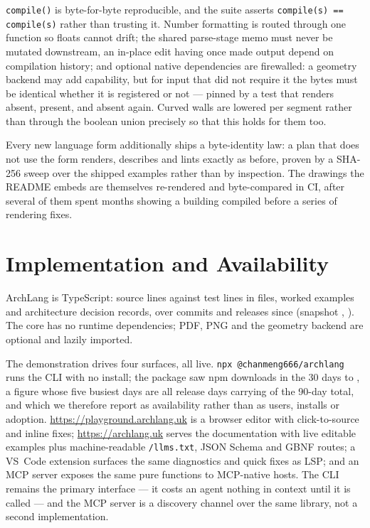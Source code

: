 \documentclass[10pt,conference]{IEEEtran}
\begin{document}
\texttt{compile()} is byte-for-byte reproducible, and the suite asserts
\texttt{compile(s) == compile(s)} rather than trusting it. Number formatting is routed
through one function so floats cannot drift; the shared parse-stage memo must never be
mutated downstream, an in-place edit having once made output depend on compilation
history; and optional native dependencies are firewalled: a geometry backend may add capability, but for input that did not require
it the bytes must be identical whether it is registered or not --- pinned by a test
that renders absent, present, and absent again. Curved walls are lowered per segment
rather than through the boolean union precisely so that this holds for them too.

Every new language form additionally ships a byte-identity law: a plan that does not
use the form renders, describes and lints exactly as before, proven by a SHA-256 sweep
over the \factExamples{} shipped examples rather than by inspection. The drawings the
README embeds are themselves re-rendered and byte-compared in CI, after several of them
spent months showing a building compiled before a series of rendering fixes.


\section{Implementation and Availability}

ArchLang is TypeScript: \factSrcLines{} source lines against \factTestLines{} test
lines in \factTestFiles{} files, \factExamples{} worked examples and \factAdrs{}
architecture decision records, over \factCommits{} commits and \factTags{} releases
since \factFirstCommit{} (snapshot \factSnapshotCommit{}, \factSnapshotDate{}). The
core has no runtime dependencies; PDF, PNG and the geometry backend are optional and
lazily imported.

The demonstration drives four surfaces, all live. \texttt{npx @chanmeng666/archlang}
runs the CLI with no install; the package saw \factNpmThirty{} npm downloads in the 30
days to \factNpmFetched{}, a figure whose five busiest days are all release days
carrying \factNpmTopFiveShare{} of the 90-day total, and which we therefore report as
availability rather than as users, installs or adoption.
\url{https://playground.archlang.uk} is a browser editor with click-to-source and
inline fixes; \url{https://archlang.uk} serves the documentation with live editable
examples plus machine-readable \texttt{/llms.txt}, JSON Schema and GBNF routes; a
VS~Code extension surfaces the same diagnostics and quick fixes as LSP; and an MCP
server \cite{mcp2026spec} exposes the same pure functions to
MCP-native hosts. The CLI remains the primary interface --- it costs an agent nothing
in context until it is called --- and the MCP server is a discovery channel over the
same library, not a second implementation.
\end{document}
